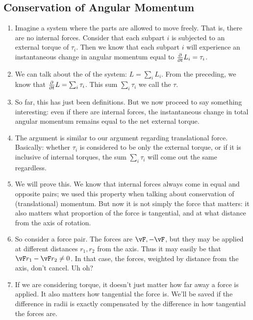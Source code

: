 \subsection{Conservation of Angular Momentum}

\begin{enumerate}
  \item Imagine a system where the parts are allowed to move freely.
  That is, there are no internal forces. Consider that each subpart $i$
  is subjected to an external torque of $\tau_i$. Then we know that each
  subpart $i$ will experience an instantaneous change in angular
  momentum equal to $\frac{\partial }{\partial t} L_i = \tau_i$.

  \item We can talk about the  of the
  system: $L = \sum_i L_i$. From the preceding, we know that
  $\frac{\partial }{\partial t} L = \sum_i \tau_i$. This sum $\sum_i \tau_i$ we call the
   $\tau$.

  \item So far, this has just been definitions. But we now proceed to
  say something interesting: even if there are internal forces, the
  instantaneous change in total angular momentum remains equal to the
  net external torque.

  \item The argument is similar to our argument regarding translational
  force. Basically: whether $\tau_i$ is considered to be only the
  external torque, or if it is inclusive of internal torques, the sum
  $\sum_i \tau_i$ will come out the same regardless.

  \item We will prove this. We know that internal forces always come in
  equal and opposite pairs; we used this property when talking about
  conservation of (translational) momentum. But now it is not simply the
  force that matters: it also matters what proportion of the force is
  tangential, and at what distance from the axis of rotation.

  \item So consider a force pair. The forces are $\vF, -\vF$, but they
  may be applied at different distances $r_1, r_2$ from the axis. Thus
  it may easily be that $\vF r_1 - \vF r_2 \ne 0$. In that case, the
  forces, weighted by distance from the axis, don't cancel. Uh oh?

  \item If we are considering torque, it doesn't just matter how far
  away a force is applied. It also matters how tangential the force is.
  We'll be saved if the difference in radii is exactly compensated by
  the difference in how tangential the forces are.


\end{enumerate}
